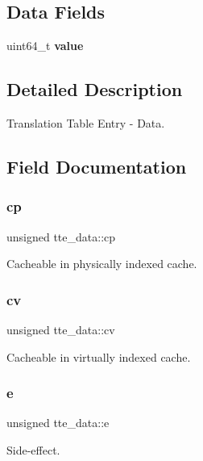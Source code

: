 \subsection*{Data Fields}
\begin{DoxyCompactItemize}
\item 
\mbox{\label{uniontte__data_a5a8826c2e3f9db11069e75004a6a8d8a}} 
uint64\+\_\+t {\bfseries value}
\end{DoxyCompactItemize}


\subsection{Detailed Description}
Translation Table Entry -\/ Data. 

\subsection{Field Documentation}
\mbox{\label{uniontte__data_a2318b4bff67490b93215c915b6fab138}} 
\subsubsection{\texorpdfstring{cp}{cp}}
{\footnotesize\ttfamily unsigned tte\+\_\+data\+::cp}

Cacheable in physically indexed cache. \mbox{\label{uniontte__data_a65f1f70d5bc84743c18d0c3c198f8c36}} 
\subsubsection{\texorpdfstring{cv}{cv}}
{\footnotesize\ttfamily unsigned tte\+\_\+data\+::cv}

Cacheable in virtually indexed cache. \mbox{\label{uniontte__data_a8bb7e896c8df99e176b73eaf4543021f}} 
\subsubsection{\texorpdfstring{e}{e}}
{\footnotesize\ttfamily unsigned tte\+\_\+data\+::e}

Side-\/effect. \mbox{\label{uniontte__data_a5b6100ed70995bc3354654ef1546ee95}} 
